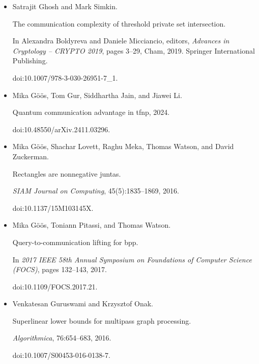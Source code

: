\begin{itemize}
\item[] 
[27]

Satrajit Ghosh and Mark Simkin.


The communication complexity of threshold private set intersection.


In Alexandra Boldyreva and Daniele Micciancio, editors, \emph{Advances
in Cryptology – CRYPTO 2019}, pages 3–29, Cham, 2019. Springer
International Publishing.


doi:10.1007/978-3-030-26951-7\_1.





\item[] 
[28]

Mika Göös, Tom Gur, Siddhartha Jain, and Jiawei Li.


Quantum communication advantage in tfnp, 2024.


doi:10.48550/arXiv.2411.03296.





\item[] 
[29]

Mika Göös, Shachar Lovett, Raghu Meka, Thomas Watson, and David
Zuckerman.


Rectangles are nonnegative juntas.


\emph{SIAM Journal on Computing}, 45(5):1835–1869, 2016.


doi:10.1137/15M103145X.





\item[] 
[30]

Mika Göös, Toniann Pitassi, and Thomas Watson.


Query-to-communication lifting for bpp.


In \emph{2017 IEEE 58th Annual Symposium on Foundations of Computer
Science (FOCS)}, pages 132–143, 2017.


doi:10.1109/FOCS.2017.21.





\item[] 
[31]

Venkatesan Guruswami and Krzysztof Onak.


Superlinear lower bounds for multipass graph processing.


\emph{Algorithmica}, 76:654–683, 2016.


doi:10.1007/S00453-016-0138-7.






\end{itemize}
